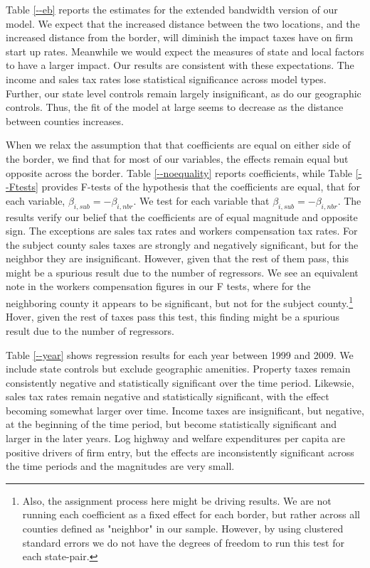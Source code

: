 Table \ref{--eb} reports the estimates for the extended bandwidth version of our model. We expect that the increased distance between the two locations, and the increased distance from the border, will diminish the impact taxes have on firm start up rates.  Meanwhile we would expect the  measures of state and local factors to have a larger impact.  Our results are consistent with these expectations. The income and sales tax rates lose statistical significance across model types. Further, our state level controls remain largely insignificant, as do our geographic controls. Thus, the fit of the model at large seems to decrease as the distance between counties increases. 

When we relax the assumption that  that coefficients are equal on either side of the border, we find that for most of our variables, the effects remain equal but opposite across the border. Table \ref{--noequality} reports coefficients, while Table \ref{--Ftests} provides F-tests of the hypothesis that the coefficients are equal, that for each variable, $\beta_{i,sub} = - \beta_{i,nbr}$. We test for each variable that $\beta_{i,sub} = - \beta_{i,nbr}$. The results verify our belief that the coefficients are of equal magnitude and opposite sign. The exceptions are sales tax rates and workers compensation tax rates. For the subject county sales taxes are strongly and negatively significant, but for the neighbor they are insignificant. However, given that the rest of them pass, this might be a spurious result due to the number of regressors. We see an equivalent note in the workers compensation figures in our F tests, where for the neighboring county it appears to be significant, but not for the subject county.\footnote{Also, the assignment process here might be driving results. We are not running each coefficient as a fixed effect for each border, but rather across all counties defined as "neighbor" in our sample. However, by using clustered standard errors we do not have the degrees of freedom to run this test for each state-pair.} Hover, given the rest of taxes pass this test, this finding might be a spurious result due to the number of regressors.

Table \ref{--year} shows regression results for each  year between 1999 and 2009. We include state controls but exclude geographic amenities. Property taxes remain consistently negative and statistically significant over the time period. Likewsie, sales tax rates remain negative and statistically significant, with the effect becoming somewhat larger over time.  Income taxes are insignificant, but negative, at the beginning of the time period, but  become statistically significant and larger in the later years. Log highway and welfare expenditures per capita are positive drivers of firm entry, but the effects are inconsistently significant across the time periods and the magnitudes are very small.


